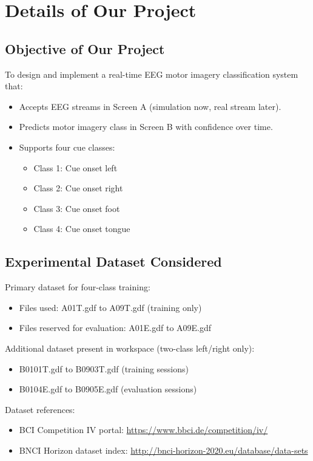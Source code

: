 \documentclass[12pt,a4paper]{article}
\begin{document}
\section{Details of Our Project}
\subsection{Objective of Our Project}
To design and implement a real-time EEG motor imagery classification system that:
\begin{itemize}[leftmargin=1.5em]
  \item Accepts EEG streams in Screen A (simulation now, real stream later).
  \item Predicts motor imagery class in Screen B with confidence over time.
  \item Supports four cue classes:
  \begin{itemize}[leftmargin=1.5em]
    \item Class 1: Cue onset left
    \item Class 2: Cue onset right
    \item Class 3: Cue onset foot
    \item Class 4: Cue onset tongue
  \end{itemize}
\end{itemize}

\subsection{Experimental Dataset Considered}
Primary dataset for four-class training:
\begin{itemize}[leftmargin=1.5em]
  \item Files used: A01T.gdf to A09T.gdf (training only)
  \item Files reserved for evaluation: A01E.gdf to A09E.gdf
\end{itemize}

Additional dataset present in workspace (two-class left/right only):
\begin{itemize}[leftmargin=1.5em]
  \item B0101T.gdf to B0903T.gdf (training sessions)
  \item B0104E.gdf to B0905E.gdf (evaluation sessions)
\end{itemize}

Dataset references:
\begin{itemize}[leftmargin=1.5em]
  \item BCI Competition IV portal: \url{https://www.bbci.de/competition/iv/}
  \item BNCI Horizon dataset index: \url{http://bnci-horizon-2020.eu/database/data-sets}
\end{itemize}
\end{document}
